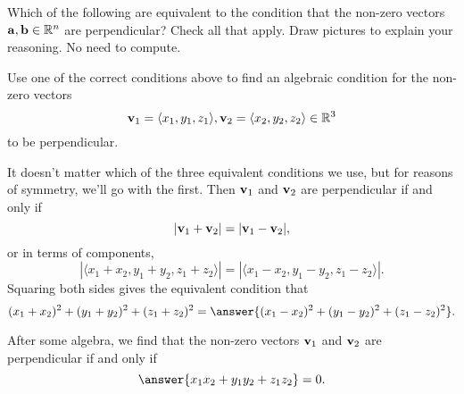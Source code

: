 \documentclass{ximera}
\begin{document}
\begin{question}  \label{Q235r74:Scalar}
Which of the following are equivalent to the condition that the non-zero vectors ${\bf a}, {\bf b} \in \mathbb{R}^n$ are perpendicular? Check all that apply. Draw pictures to explain your reasoning. No need to compute.

\begin{selectAll}  
  \end{selectAll}  
 \end{question}


\begin{question}   \label{Q32erdf:Scalar}
Use one of the correct conditions above to find an algebraic condition for the non-zero vectors
\[
    {\bf v}_1= \langle x_1, y_1, z_1 \rangle, {\bf v}_2 = \langle  x_2, y_2, z_2\rangle \in \mathbb{R}^3 
\]
to be perpendicular.

\begin{explanation}
It doesn't matter which of the three equivalent conditions we use, but for reasons of symmetry, we'll go with the first. Then ${\bf v}_1$ and ${\bf v}_2$ are perpendicular if and only if
\[
   |  {\bf v}_1 + {\bf v}_2 | = | {\bf v}_1 - {\bf v}_2 | ,
\]
or in terms of components,
\[
        | \langle   x_1+x_2 , y_1+y_2, z_1 + z_2   \rangle  | = | \langle   x_1-x_2 , y_1-y_2, z_1 - z_2   \rangle  | .
\]
Squaring both sides gives the equivalent condition that
\[
          (x_1 + x_2)^2 + (y_1 + y_2)^2 + (z_1 + z_2)^2 = \answer{(x_1 - x_2)^2 + (y_1 - y_2)^2 + (z_1 - z_2)^2} .
\]

After some algebra, we find that the non-zero vectors ${\bf v}_1$ and ${\bf v}_2$ are perpendicular if and only if
\[
      \answer{x_1 x_2 + y_1y_2 + z_1 z_2} = 0.
\]
\end{explanation}
\end{question}
\end{document}
